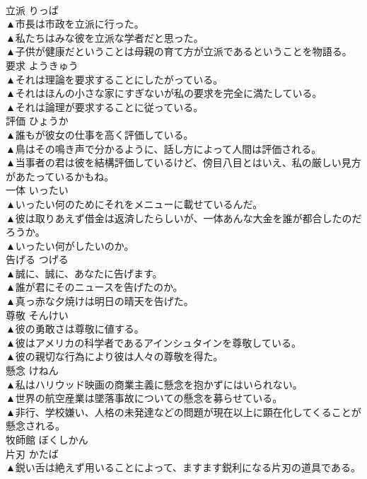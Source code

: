 \documentclass[8pt]{extreport}
\begin{document}
\begin{CJK}{UTF8}{min}
\\	立派	りっぱ	
\\	▲市長は市政を立派に行った。 
\\	▲私たちはみな彼を立派な学者だと思った。 
\\	▲子供が健康だということは母親の育て方が立派であるということを物語る。 
\\	要求	ようきゅう	
\\	▲それは理論を要求することにしたがっている。 
\\	▲それはほんの小さな家にすぎないが私の要求を完全に満たしている。 
\\	▲それは論理が要求することに従っている。 
\\	評価	ひょうか	
\\	▲誰もが彼女の仕事を高く評価している。 
\\	▲鳥はその鳴き声で分かるように、話し方によって人間は評価される。 
\\	▲当事者の君は彼を結構評価しているけど、傍目八目とはいえ、私の厳しい見方があたっているかもね。 
\\	一体	いったい	
\\	▲いったい何のためにそれをメニューに載せているんだ。 
\\	▲彼は取りあえず借金は返済したらしいが、一体あんな大金を誰が都合したのだろうか。 
\\	▲いったい何がしたいのか。 
\\	告げる	つげる	
\\	▲誠に、誠に、あなたに告げます。 
\\	▲誰が君にそのニュースを告げたのか。 
\\	▲真っ赤な夕焼けは明日の晴天を告げた。 
\\	尊敬	そんけい	
\\	▲彼の勇敢さは尊敬に値する。 
\\	▲彼はアメリカの科学者であるアインシュタインを尊敬している。 
\\	▲彼の親切な行為により彼は人々の尊敬を得た。 
\\	懸念	けねん	
\\	▲私はハリウッド映画の商業主義に懸念を抱かずにはいられない。 
\\	▲世界の航空産業は墜落事故についての懸念を募らせている。 
\\	▲非行、学校嫌い、人格の未発達などの問題が現在以上に顕在化してくることが懸念される。 
\\	牧師館	ぼくしかん	
\\	片刃	かたば	
\\	▲鋭い舌は絶えず用いることによって、ますます鋭利になる片刃の道具である。 

\end{CJK}
\end{document}
